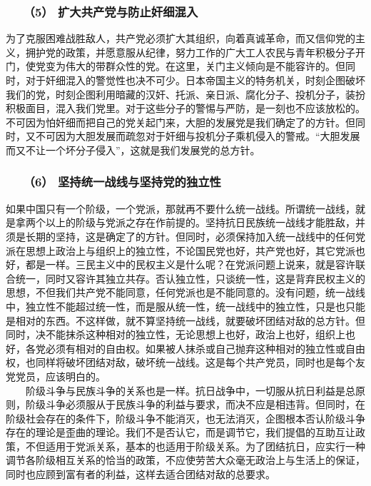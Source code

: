 \documentclass[cn,11pt,chinese]{elegantbook}
\def\myformat#1{\hfil\hfil #1}
\begin{document}
\subsubsection*{\myformat{　　（5） 扩大共产党与防止奸细混入}}
为了克服困难战胜敌人，共产党必须扩大其组织，向着真诚革命，而又信仰党的主义，拥护党的政策，并愿意服从纪律，努力工作的广大工人农民与青年积极分子开门，使党变为伟大的带群众性的党。在这里，关门主义倾向是不能容许的。但同时，对于奸细混入的警觉性也决不可少。日本帝国主义的特务机关，时刻企图破坏我们的党，时刻企图利用暗藏的汉奸、托派、亲日派、腐化分子、投机分子，装扮积极面目，混入我们党里。对于这些分子的警惕与严防，是一刻也不应该放松的。不可因为怕奸细而把自己的党关起门来，大胆的发展党是我们确定了的方针。但同时，又不可因为大胆发展而疏忽对于奸细与投机分子乘机侵入的警戒。“大胆发展而又不让一个坏分子侵入”，这就是我们发展党的总方针。\\
\subsubsection*{\myformat{　　（6） 坚持统一战线与坚持党的独立性}}
如果中国只有一个阶级，一个党派，那就再不要什么统一战线。所谓统一战线，就是拿两个以上的阶级与党派之存在作前提的。坚持抗日民族统一战线才能胜敌，并须是长期的坚持，这是确定了的方针。但同时，必须保持加入统一战线中的任何党派在思想上政治上与组织上的独立性，不论国民党也好，共产党也好，其它党派也好，都是一样。三民主义中的民权主义是什么呢？在党派问题上说来，就是容许联合统一，同时又容许其独立共存。否认独立性，只谈统一性，这是背弃民权主义的思想，不但我们共产党不能同意，任何党派也是不能同意的。没有问题，统一战线中，独立性不能超过统一性，而是服从统一性，统一战线中的独立性，只是也只能是相对的东西。不这样做，就不算坚持统一战线，就要破坏团结对敌的总方针。但同时，决不能抹杀这种相对的独立性，无论思想上也好，政治上也好，组织上也好，各党必须有相对的自由权。如果被人抹杀或自己抛弃这种相对的独立性或自由权，也同样将破坏团结对敌，破坏统一战线。这是每个共产党员，同时也是每个友党党员，应该明白的。\\
　　阶级斗争与民族斗争的关系也是一样。抗日战争中，一切服从抗日利益是总原则，阶级斗争必须服从于民族斗争的利益与要求，而决不应是相违背。但同时，在阶级社会存在的条件下，阶级斗争不能消灭，也无法消灭，企图根本否认阶级斗争存在的理论是歪曲的理论。我们不是否认它，而是调节它，我们提倡的互助互让政策，不但适用于党派关系，基本的也适用于阶级关系。为了团结抗日，应实行一种调节各阶级相互关系的恰当的政策，不应使劳苦大众毫无政治上与生活上的保证，同时也应顾到富有者的利益，这样去适合团结对敌的总要求。\\
\end{document}
